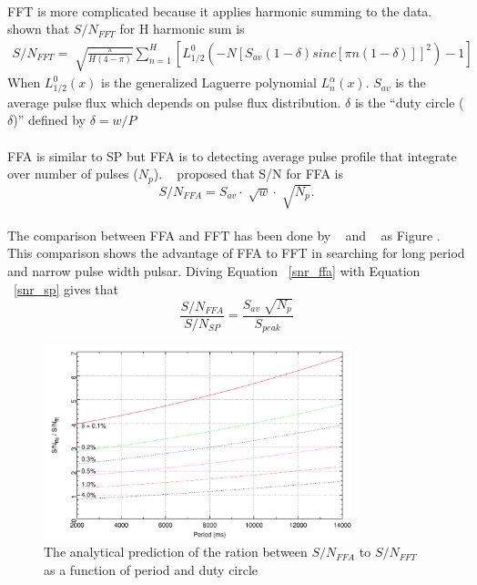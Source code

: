 \documentclass[thesis_msc.tex]{subfiles}
\begin{document}
        \paragraph{} FFT is more complicated because it applies harmonic summing to the data.~\cite{kondratiev2009new} shown that $S/N_{FFT}$ for H harmonic sum is  
        		\begin{eqnarray}
		S/N_{FFT}=\sqrt[]{\frac{\pi}{H(4-\pi)}} \sum^H_{n=1}[L^0_{1/2}(-N[S_{av}(1-\delta)sinc[\pi n (1-\delta)]]^2)-1] \label{snr_fft}
		\end{eqnarray}    
        When $L^0_{1/2}(x)$ is the generalized Laguerre polynomial $L^{\alpha}_{n}(x)$. $S_{av}$ is the average pulse flux which depends on pulse flux distribution. $\delta$ is the ``duty circle ($\delta$)'' defined by $\delta=w/P$
        \paragraph{} FFA is similar to SP but FFA is to detecting average pulse profile that integrate over number of pulses ($N_p$).  ~\cite{kondratiev2009new} proposed that S/N for FFA is  
        \begin{equation}
		S/N_{FFA}=S_{av} \cdot \sqrt[]{w} \cdot \sqrt[]{N_p}. \label{snr_ffa}
		\end{equation}
	\paragraph{} The comparison between FFA and FFT has been done by ~\cite{Andrew} and ~\cite{kondratiev2009new} as Figure . This comparison shows the advantage of FFA to FFT in searching for long period and narrow pulse width pulsar.  Diving Equation  ~\ref{snr_ffa} with Equation ~\ref{snr_sp} gives that 
    \begin{equation} \label{r}
    \frac{S/N_{FFA}}{S/N_{SP}}=\frac{S_{av} \sqrt[]{N_p}}{S_{peak}}
    \end{equation}
    
\begin{figure}[h] \centering
\includegraphics[width=0.80\textwidth]{figures/FFA_FFT.png}
\caption{The analytical prediction of the ration between $S/N_{FFA}$ to $S/N_{FFT}$ as a function of period and duty circle}
\label{FFA_FFT_com}
\end{figure}
\end{document}
